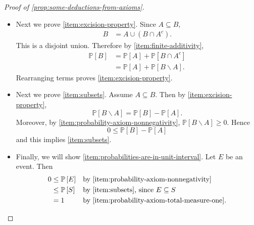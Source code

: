 \documentclass[10pt]{article}
\theoremstyle{definition}
\newcommand{\1}[1]{\textbf{1}_{\left[#1\right]}} %
\def\P{\mathbb{P}} %
\begin{document}
\begin{proof}[Proof of \cref{prop:some-deductions-from-axioms}]
\begin{itemize}
    \item 

    Next we prove \ref{item:excision-property}. Since $A\subseteq B$,
    \begin{align*}
      B 
      &= A \cup (B\cap A^{c}).
    \end{align*}
    This is a disjoint union. Therefore by \ref{item:finite-additivity},
    \begin{align*}
      \P\left[B \right] 
      &= \P\left[A \right] + \P\left[B\cap A^{c} \right]\\
      &= \P\left[A \right] + \P\left[B\backslash A \right].
    \end{align*}
    Rearranging terms proves \ref{item:excision-property}.
    
    \item  Next we prove \ref{item:subsets}. Assume $A\subseteq B$. Then by \ref{item:excision-property},
    \begin{equation*}
      \P\left[B\backslash A \right] = \P\left[B \right] - \P\left[A \right].
    \end{equation*}
    Moreover, by \ref{item:probability-axiom-nonnegativity}, $\P\left[B\backslash A \right] \geq 0$.
    Hence
    \begin{equation*}
      0 \leq  \P\left[B \right] - \P\left[A \right]
    \end{equation*}
    and this implies \ref{item:subsets}.
    
    \item   Finally, we will show \ref{item:probabilities-are-in-unit-interval}. Let $E$ be an event. Then
    \begin{align*}
      0 
      &\leq \P\left[E \right]  &&\text{by \ref{item:probability-axiom-nonnegativity} }\\
      &\leq  \P\left[S \right] &&\text{by \ref{item:subsets}, since $E\subseteq S$}\\
      &=1 &&\text{by \ref{item:probability-axiom-total-measure-one}.}
    \end{align*}
  \end{itemize}
\end{proof}



\newpage
\end{document}
